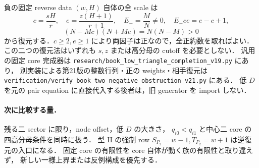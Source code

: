 負の固定 reverse data $(w,H)$ 自体の全 scale は
\[
 c=\frac{sH}{r},\quad e=\frac{z(H+1)}{r+1},\quad
 E_-=\frac MN\ne0,\quad E_-ce=e-c+1,
\]
\[
 (N-Mc)(N+Me)=N(N-M)>0
\]
から復元する．$c\ge2,e\ge1$ により両因子は正なので，全正約数を取ればよい．
この二つの復元法はいずれも $s,z$ または高分母の cutoff を必要としない．
汎用の固定 core 完成器は \nolinkurl{research/book_low_triangle_completion_v19.py} にあり，
別実装による第21版の整数行列・正の weights・相手復元は
\nolinkurl{verification/verify_book_two_negative_obstruction_v21.py} にある．
低 $D$ を元の pair equation に直接代入する後者は，旧 generator を import しない．

\paragraph{次に比較する量．}
残る二 sector に限り，node offset，低 $D$ の大きさ，
$q_{i0}<q_{i1}$ と中心二 core の四高分母条件を同時に扱う．
型 II の強制 row $S_{P_2}=w-1,T_{P_2}=w+1$ は逆復元の入口になる．
固定 core の有限性を core 自体が動く族の有限性と取り違えず，
新しい一様上界または反例構成を優先する．

